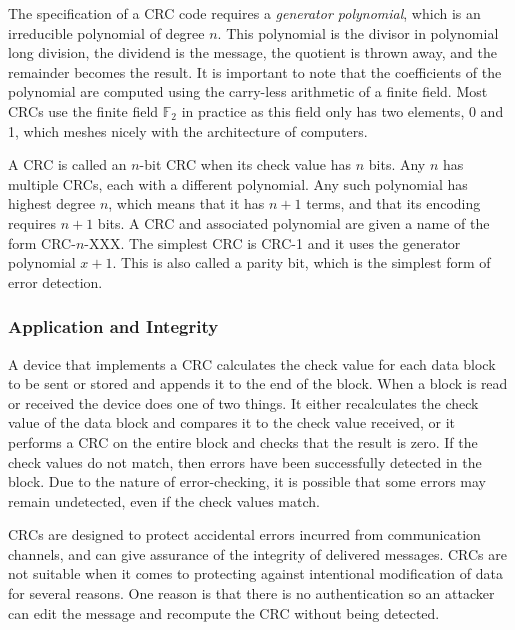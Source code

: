 \documentclass{article}
\begin{document}
The specification of a CRC code requires a \textit{generator polynomial}, which is an irreducible polynomial of degree $n$. This polynomial is the divisor in polynomial long division, the dividend is the message, the quotient is thrown away, and the remainder becomes the result. It is important to note that the coefficients of the polynomial are computed using the carry-less arithmetic of a 
finite field. Most CRCs use the finite field $\mathbb{F}_{2}$ in practice as this field only has two elements, 0 and 1, which meshes nicely with the architecture of computers.

A CRC is called an $n$-bit CRC when its check value has $n$ bits. Any $n$ has multiple CRCs, each with a different polynomial. Any such polynomial has highest degree $n$, which means that it has $n + 1$ terms, and that its encoding requires $n + 1$ bits. A CRC and associated polynomial are given a name of the form CRC-$n$-XXX. The simplest CRC is CRC-1 and it uses the generator polynomial $x + 1$. This is also called a parity bit, which is the simplest form of error detection.

\subsubsection{Application and Integrity}
A device that implements a CRC calculates the check value for each data block to be sent or stored and appends it to the end of the block. When a block is read or received the device does one of two things. It either recalculates the check value of the data block and compares it to the check value received, or it performs a CRC on the entire block and checks that the result is zero. If the check values do not match, then errors have been successfully detected in the block. Due to the nature of error-checking, it is possible that some errors may remain undetected, even if the check values match. 

CRCs are designed to protect accidental errors incurred from communication channels, and can give assurance of the integrity of delivered messages. CRCs are not suitable when it comes to protecting against intentional modification of data for several reasons. One reason is that there is no authentication so an attacker can edit the message and recompute the CRC without being detected.
\end{document}
